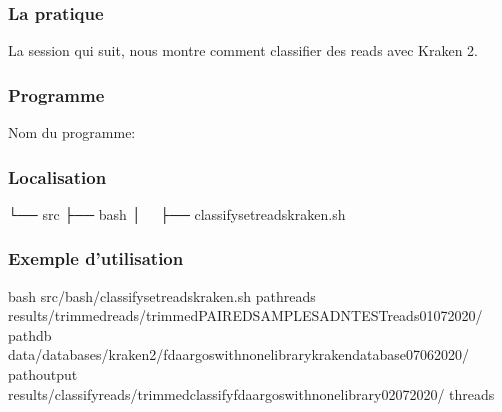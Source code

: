 \documentclass[letterpaper,10pt,french]{sphinxmanual}
\begin{document}
\subsubsection{La pratique}
\label{\detokenize{tutorial:id25}}
La session qui suit, nous montre comment classifier des reads avec Kraken 2.


\subsubsection{Programme}
\label{\detokenize{tutorial:id26}}
Nom du programme:

\begin{sphinxVerbatim}[commandchars=\\\{\}]
\end{sphinxVerbatim}


\subsubsection{Localisation}
\label{\detokenize{tutorial:id27}}
\begin{sphinxVerbatim}[commandchars=\\\{\}]
└── src
 ├── bash
 │   ├── classify\PYGZus{}set\PYGZus{}reads\PYGZus{}kraken.sh
\end{sphinxVerbatim}


\subsubsection{Exemple d’utilisation}
\label{\detokenize{tutorial:id28}}
\begin{sphinxVerbatim}[commandchars=\\\{\}]
bash src/bash/classify\PYGZus{}set\PYGZus{}reads\PYGZus{}kraken.sh 
             \PYGZhy{}path\PYGZus{}reads results/trimmed\PYGZus{}reads/trimmed\PYGZus{}PAIRED\PYGZus{}SAMPLES\PYGZus{}ADN\PYGZus{}TEST\PYGZus{}reads\PYGZus{}01\PYGZus{}07\PYGZus{}2020/ 
             \PYGZhy{}path\PYGZus{}db data/databases/kraken\PYGZus{}2/fda\PYGZus{}argos\PYGZus{}with\PYGZus{}none\PYGZus{}library\PYGZus{}kraken\PYGZus{}database\PYGZus{}07\PYGZus{}06\PYGZus{}2020/ 
             \PYGZhy{}path\PYGZus{}output results/classify\PYGZus{}reads/trimmed\PYGZus{}classify\PYGZus{}fda\PYGZus{}argos\PYGZus{}with\PYGZus{}none\PYGZus{}library\PYGZus{}02\PYGZus{}07\PYGZus{}2020/ 
             \PYGZhy{}threads 
\end{sphinxVerbatim}
\end{document}
